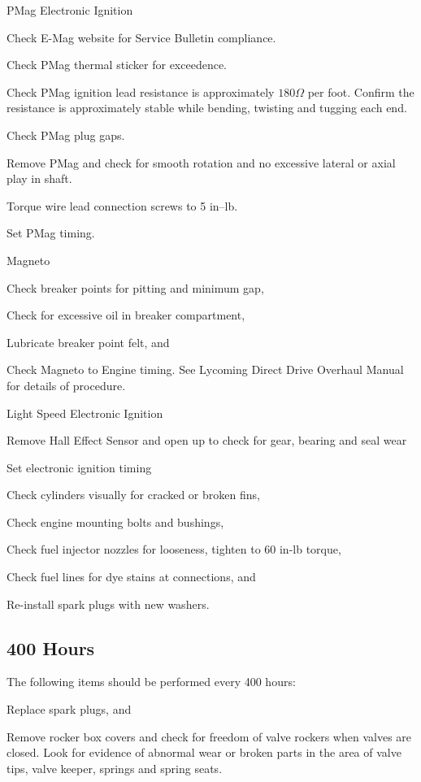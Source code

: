\begin{enumerate*}
{	\item PMag Electronic Ignition
	\begin{enumerate*}
		\item Check E-Mag website for Service Bulletin compliance.
		\item Check PMag thermal sticker for exceedence. 
		\item Check PMag ignition lead resistance is approximately $180\Omega$ per foot.  Confirm the resistance is approximately stable while bending, twisting and tugging each end.
		\item Check PMag plug gaps.
		\item Remove PMag and check for smooth rotation and no excessive lateral or axial play in shaft. 
		\item Torque wire lead connection screws to 5 in--lb.
		\item Set PMag timing. 
	\end{enumerate*}}
{	\item Magneto
	\begin{enumerate*}
		\item Check breaker points for pitting and minimum gap, 
		\item Check for excessive oil in breaker compartment, 
		\item Lubricate breaker point felt, and 
		\item Check Magneto to Engine timing. See Lycoming Direct Drive Overhaul Manual for details of procedure.
	\end{enumerate*}}
	\item Light Speed Electronic Ignition
	  \begin{enumerate*}
	    \item Remove Hall Effect Sensor and open up to check for gear, bearing and seal wear
	    \item Set electronic ignition timing
    	\end{enumerate*} 	
	\item Check cylinders visually for cracked or broken fins, 
	\item Check engine mounting bolts and bushings, 
	\item Check fuel injector nozzles for looseness, tighten to 60 in-lb torque, 
	\item Check fuel lines for dye stains at connections, and 
	\item Re-install spark plugs with new washers. 
\end{enumerate*}

\subsection{400 Hours} The following items should be performed every 400 hours: 
\begin{enumerate*}
	\item Replace spark plugs, and 
	\item Remove rocker box covers and check for freedom of valve rockers when valves are closed. Look for evidence of abnormal wear or broken parts in the area of valve tips, valve keeper, springs and spring seats. 
\end{enumerate*}

